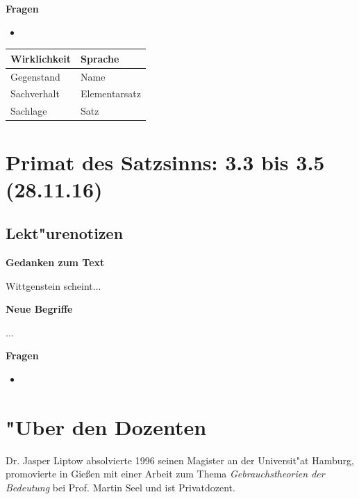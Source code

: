 \documentclass[]{scrartcl}
\begin{document}
\textbf{Fragen}

\begin{itemize}
  \item 
\end{itemize}

\begin{center}
    \begin{tabular}{  l | l }
    \textbf{Wirklichkeit} & \textbf{Sprache}\\ \hline
    Gegenstand & Name \\ 
    Sachverhalt & Elementarsatz \\
    Sachlage & Satz \\
    \end{tabular}
\end{center}


\section{Primat des Satzsinns: 3.3 bis 3.5\\(28.11.16)}


\subsection{Lekt"urenotizen}
\textbf{Gedanken zum Text}

Wittgenstein scheint...

\vspace{10pt}
\textbf{Neue Begriffe}

\begin{description}[leftmargin=!,labelwidth=\widthof{\bfseries Sachverhalt}]
  \item[Bild] ...
  \item[Tatsache] 
\end{description}

\textbf{Fragen}

\begin{itemize}
  \item 
\end{itemize}

\newpage
\section{"Uber den Dozenten}
Dr. Jasper Liptow absolvierte 1996 seinen Magister an der Universit"at Hamburg, promovierte in Gie\ss en mit einer Arbeit zum Thema \emph{Gebrauchstheorien der Bedeutung} bei Prof. Martin Seel und ist Privatdozent.
\end{document}
